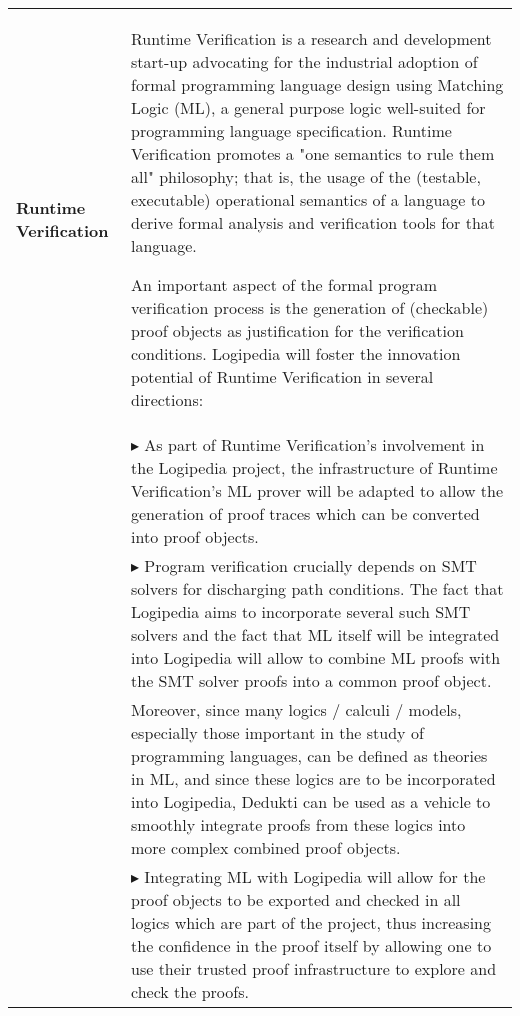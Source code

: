 \begin{longtable*}{|p{0.10\textwidth}|p{0.85\textwidth}|}
\hline

{\bf Runtime Verification} &

Runtime Verification is a research and development start-up advocating for the industrial
adoption of formal programming language design using Matching Logic (ML), a
general purpose logic well-suited for programming language specification.
Runtime Verification promotes a "one semantics to rule them all" philosophy; that is, the usage
of the (testable, executable) operational semantics of a language to derive
formal analysis and verification tools for that language.

An important aspect of the formal program verification process is the
generation of (checkable) proof objects as justification for the verification
conditions.
Logipedia will foster the innovation potential of Runtime Verification in several directions:\\
&
$\blacktriangleright$
As part of Runtime Verification's involvement in the Logipedia project, the infrastructure of 
Runtime Verification's ML prover will be adapted to allow the generation of proof traces which
can be converted into proof objects.
\\
&
$\blacktriangleright$
Program verification crucially depends on SMT solvers for discharging
path conditions. The fact that Logipedia aims to incorporate several such SMT
solvers and the fact that ML itself will be integrated into Logipedia will
allow to combine ML proofs with the SMT solver proofs into a common proof
object.\\

& Moreover, since many logics / calculi / models, especially those
important in the study of programming languages, can be defined as
theories in ML, and since these logics are to be incorporated into
Logipedia, Dedukti can be used as a vehicle to smoothly integrate
proofs from these logics into more complex combined proof objects.\\ &
$\blacktriangleright$ Integrating ML with Logipedia will allow for the
proof objects to be exported and checked in all logics which are part
of the project, thus increasing the confidence in the proof itself by
allowing one to use their trusted proof infrastructure to explore and
check the proofs.  \\ \hline
\end{longtable*}


